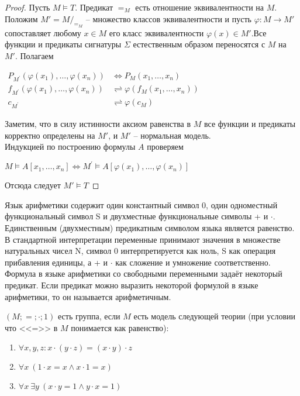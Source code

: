 \begin{proof}
	Пусть $M \vDash T$. Предикат $=_M$ есть отношение эквивалентности на $M$. Положим $M'=M/_{=_M}$
	-- множество классов эквивалентности и пусть $\varphi\colon M\to M'$сопоставляет любому $x\in M$ его класс
	эквивалентности $\varphi(x)\in M'$.Все функции и предикаты сигнатуры $\Sigma$ естественным образом переносятся с
	$M$ на $M'$. Полагаем
	\begin{center}
		$\begin{aligned}
			P_{M^{\prime}}\left(\varphi\left(x_{1}\right), \ldots, \varphi\left(x_{n}\right)\right) &
			\Longleftrightarrow P_{M}\left(x_{1}, \ldots, x_{n}\right) \\
			f_{M^{\prime}}\left(\varphi\left(x_{1}\right), \ldots, \varphi\left(x_{n}\right)\right) &
			\rightleftharpoons \varphi\left(f_{M}\left(x_{1}, \ldots, x_{n}\right)\right) \\
			c_{M^{\prime}} & \rightleftharpoons \varphi\left(c_{M}\right)
		\end{aligned}$
	\end{center}
	Заметим, что в силу истинности аксиом равенства в $M$ все функции и предикаты корректно определены на $M'$, и
	$M'$ -- нормальная модель.\\
	Индукцией по построению формулы $A$ проверяем
	\begin{center}
		$M \vDash A\left[x_{1}, \ldots, x_{n}\right] \Longleftrightarrow M^{\prime} \vDash
		A\left[\varphi\left(x_{1}\right), \ldots, \varphi\left(x_{n}\right)\right]$
	\end{center}
	Отсюда следует $M'\vDash T$
\end{proof}
\begin{example}
	Язык арифметики содержит один константный символ 0, один одноместный функциональный символ S и двухместные
	функциональные символы + и $\cdot$. Единственным (двухместным) предикатным символом языка является равенство. В
	стандартной интерпретации переменные принимают значения в множестве натуральных чисел N, символ 0
	интерпретируется как ноль, S как операция прибавления единицы, а + и $\cdot$ как сложение и умножение
	соответственно. Формула в языке арифметики со свободными переменными задаёт некоторый предикат. Если предикат
	можно выразить некоторой формулой в языке арифметики, то он называется арифметичным. 
\end{example}
\begin{example}
	$(M;=;\cdot;1)$ есть группа, если $M$ есть модель следующей теории (при условии что <<=>> в $M$ понимается как
	равенство):
	\begin{enumerate}
		\item $\forall x,y,z: x\cdot(y\cdot z)=(x\cdot y)\cdot z$
		\item $\forall x \ (1 \cdot x=x \wedge x \cdot 1=x)$
		\item $\forall x \ \exists y \ (x \cdot y=1 \wedge y \cdot x=1)$
	\end{enumerate}
\end{example}
